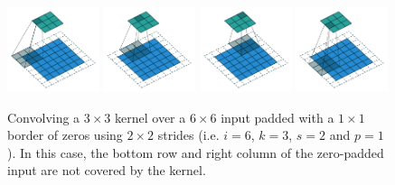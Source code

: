 \documentclass{report}
\begin{document}
\begin{figure}[p]
    \centering
    \includegraphics[width=0.24\textwidth]{pdf/padding_strides_odd_00.pdf}
    \includegraphics[width=0.24\textwidth]{pdf/padding_strides_odd_01.pdf}
    \includegraphics[width=0.24\textwidth]{pdf/padding_strides_odd_02.pdf}
    \includegraphics[width=0.24\textwidth]{pdf/padding_strides_odd_03.pdf}
    \caption{\label{fig:padding_strides_odd} Convolving a $3 \times 3$ kernel
        over a $6 \times 6$ input padded with a $1 \times 1$ border of zeros
        using $2 \times 2$ strides (i.e.  $i = 6$, $k = 3$, $s = 2$ and
        $p = 1$). In this case, the bottom row and right column of the
        zero-padded input are not covered by the kernel.}
\end{figure}
\end{document}
